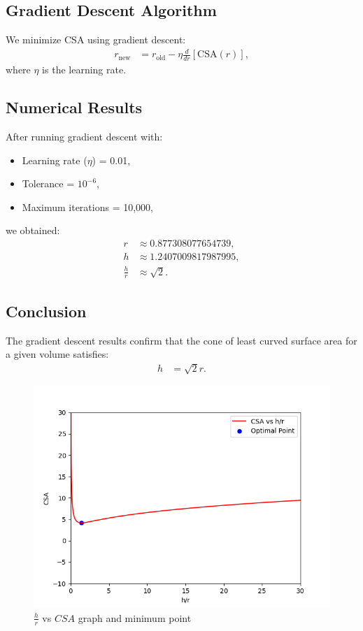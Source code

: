 \documentclass[article]{IEEEtran}
\numberwithin{figure}{enumi}
\begin{document}
\subsection*{Gradient Descent Algorithm}

We minimize CSA using gradient descent:
\begin{align}
r_{\text{new}} &= r_{\text{old}} - \eta \frac{d}{dr}[\text{CSA}(r)],
\end{align}
where \(\eta\) is the learning rate.

\subsection*{Numerical Results}

After running gradient descent with:
\begin{itemize}
    \item Learning rate (\(\eta\)) = 0.01,
    \item Tolerance = \(10^{-6}\),
    \item Maximum iterations = 10,000,
\end{itemize}
we obtained:
\begin{align}
r &\approx 0.877308077654739, \\
h &\approx 1.2407009817987995, \\
\frac{h}{r} &\approx \sqrt{2}.
\end{align}

\subsection*{Conclusion}

The gradient descent results confirm that the cone of least curved surface area for a given volume satisfies:
\begin{align}
h &= \sqrt{2}r.
\end{align}

\begin{figure}[h!]
   \centering
   \includegraphics[width=\columnwidth]{figures/fig.png}
   \caption{$\frac{h}{r}$ vs $CSA$ graph and minimum point}
   \label{stemplot}
\end{figure}
\end{document}
